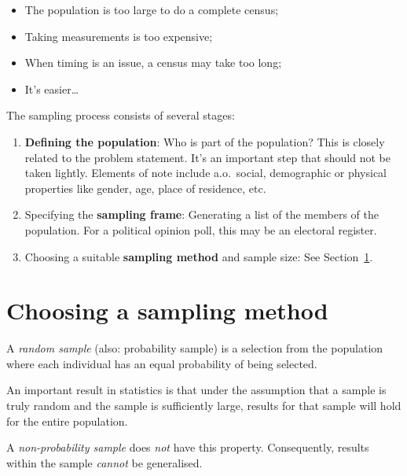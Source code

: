 \begin{itemize}
  \item The population is too large to do a complete census;
  \item Taking measurements is too expensive;
  \item When timing is an issue, a census may take too long;
  \item It's easier\dots
\end{itemize}

The sampling process consists of several stages:

\begin{enumerate}
  \item \textbf{Defining the population}: Who is part of the population? This is closely related to the problem statement. It's an important step that should not be taken lightly. Elements of note include a.o.~social, demographic or physical properties like gender, age, place of residence, etc.
  
  \item Specifying the \textbf{sampling frame}: Generating a list of the members of the population. For a political opinion poll, this may be an electoral register.
  
  \item Choosing a suitable \textbf{sampling method} and sample size: See Section~\ref{sec:choosing-a-sampling-method}.
\end{enumerate}

\section{Choosing a sampling method}
\label{sec:choosing-a-sampling-method}

\begin{definition}
  A \emph{random sample} (also: probability sample) is a selection from the population where each individual has an equal probability of being selected.
\end{definition}

An important result in statistics is that under the assumption that a sample is truly random and the sample is sufficiently large, results for that sample will hold for the entire population.

A \emph{non-probability sample} does \emph{not} have this property. Consequently, results within the sample \emph{cannot} be generalised.

